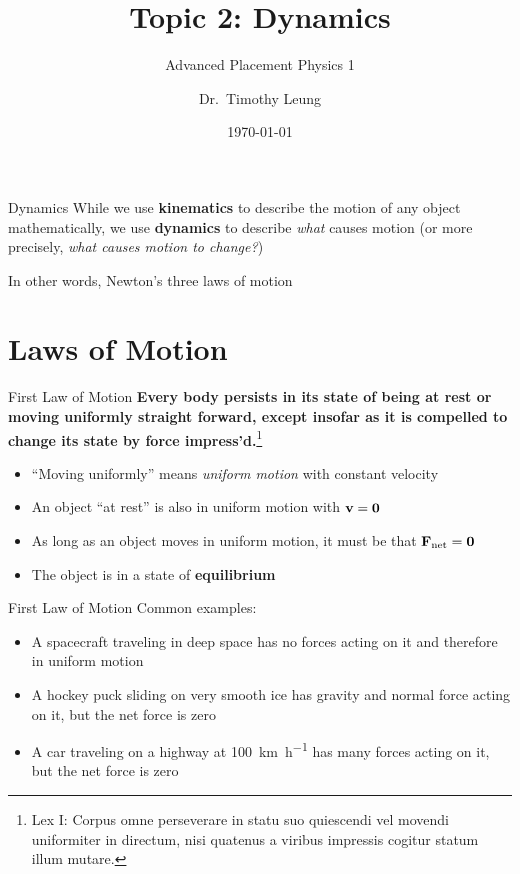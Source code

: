 \documentclass[12pt,compress,aspectratio=169]{beamer}
\title{Topic 2: Dynamics}
\subtitle{Advanced Placement Physics 1}
\author[TML]{Dr.\ Timothy Leung}
\institute{Olympiads School}
\date{\today}
\newcommand{\mb}[1]{\ensuremath\mathbf{#1}}
\begin{document}
\begin{frame}
  \maketitle
\end{frame}

\begin{frame}{Dynamics}
  While we use \textbf{kinematics} to describe the motion of any object
  mathematically, we use \textbf{dynamics} to describe \emph{what} causes
  motion (or more precisely, \emph{what causes motion to change?})

  \vspace{.4in}In other words, Newton's three laws of motion
\end{frame}



\section{Laws of Motion}

\begin{frame}{First Law of Motion}
  \textbf{Every body persists in its state of being at rest or moving uniformly
    straight forward, except insofar as it is compelled to change its state by
    force impress'd.}\footnote{Lex I: Corpus omne perseverare in statu suo
    quiescendi vel movendi uniformiter in directum, nisi quatenus a viribus
    impressis cogitur statum illum mutare.}
  
  \begin{itemize}
  \item ``Moving uniformly'' means \emph{uniform motion} with constant velocity
  \item An object ``at rest'' is also in uniform motion with $\mb{v}=\mb{0}$
  \item As long as an object moves in uniform motion, it must be that
    $\mb{F}_\mathrm{net}=\mb{0}$
  \item The object is in a state of \textbf{equilibrium}
  \end{itemize}
\end{frame}



\begin{frame}{First Law of Motion}
  Common examples:
  \begin{itemize}
  \item A spacecraft traveling in deep space has no forces acting on it
    and therefore in uniform motion
  \item A hockey puck sliding on very smooth ice has gravity and normal
    force acting on it, but the net force is zero
  \item A car traveling on a highway at \SI{100}{\kilo\metre\per\hour}
    has many forces acting on it, but the net force is zero 
  \end{itemize}
\end{frame}
\end{document}
